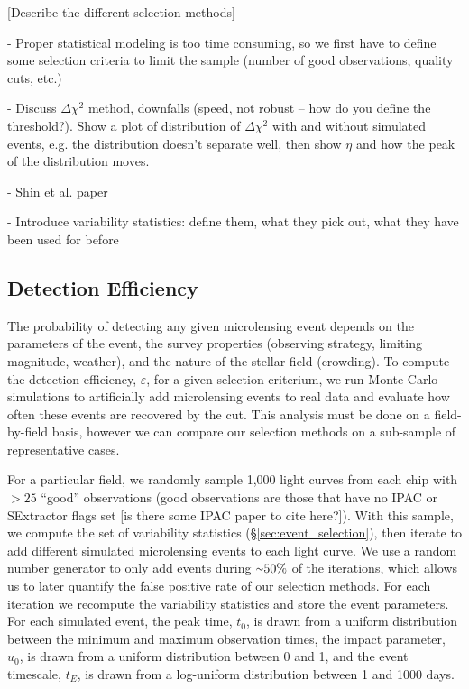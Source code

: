 \documentclass[12pt,preprint]{aastex}
\newcommand{\apwsim}{\raisebox{0.2ex}{\scriptsize$\sim$\normalsize}}
\begin{document}
[Describe the different selection methods]

- Proper statistical modeling is too time consuming, so we first have to define some selection criteria to limit the sample (number of good observations, quality cuts, etc.)

- Discuss $\Delta \chi^2$ method, downfalls (speed, not robust -- how do you define the threshold?). Show a plot of distribution of $\Delta \chi^2$ with and without simulated events, e.g. the distribution doesn't separate well, then show $\eta$ and how the peak of the distribution moves.

- Shin et al. paper

- Introduce variability statistics: define them, what they pick out, what they have been used for before

\subsection{Detection Efficiency}
The probability of detecting any given microlensing event depends on the parameters of the event, the survey properties (observing strategy, limiting magnitude, weather), and the nature of the stellar field (crowding). To compute the detection efficiency, $\varepsilon$, for a given selection criterium, we run Monte Carlo simulations to artificially add microlensing events to real data and evaluate how often these events are recovered by the cut. This analysis must be done on a field-by-field basis, however we can compare our selection methods on a sub-sample of representative cases.

For a particular field, we randomly sample 1,000 light curves from each chip with $>25$ ``good'' observations (good observations are those that have no IPAC or SExtractor flags set [is there some IPAC paper to cite here?]). With this sample, we compute the set of variability statistics (\S\ref{sec:event_selection}), then iterate to add different simulated microlensing events to each light curve. We use a random number generator to only add events during $\apwsim 50\%$ of the iterations, which allows us to later quantify the false positive rate of our selection methods. For each iteration we recompute the variability statistics and store the event parameters. For each simulated event, the peak time, $t_0$, is drawn from a uniform distribution between the minimum and maximum observation times, the impact parameter, $u_0$, is drawn from a uniform distribution between 0 and 1, and the event timescale, $t_E$, is drawn from a log-uniform distribution between 1 and 1000 days. 
\end{document}
